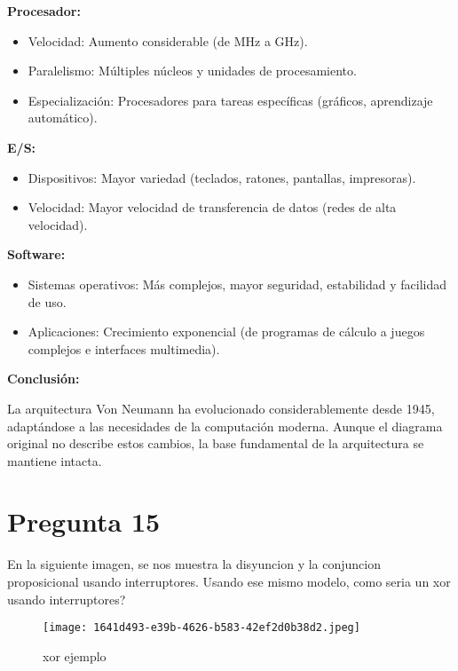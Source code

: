 \documentclass{article}
\begin{document}
\textbf{Procesador:}

\begin{itemize}
  \item Velocidad: Aumento considerable (de MHz a GHz).
  \item Paralelismo: Múltiples núcleos y unidades de procesamiento.
  \item Especialización: Procesadores para tareas específicas (gráficos, aprendizaje automático).
\end{itemize}

\textbf{E/S:}

\begin{itemize}
  \item Dispositivos: Mayor variedad (teclados, ratones, pantallas, impresoras).
  \item Velocidad: Mayor velocidad de transferencia de datos (redes de alta velocidad).
\end{itemize}

\textbf{Software:}

\begin{itemize}
  \item Sistemas operativos: Más complejos, mayor seguridad, estabilidad y facilidad de uso.
  \item Aplicaciones: Crecimiento exponencial (de programas de cálculo a juegos complejos e interfaces multimedia).
\end{itemize}

\textbf{Conclusión:}

La arquitectura Von Neumann ha evolucionado considerablemente desde 1945, adaptándose a las necesidades de la computación moderna. Aunque el diagrama original no describe estos cambios, la base fundamental de la arquitectura se mantiene intacta.

\section*{Pregunta 15}
En la siguiente imagen, se nos muestra la disyuncion y la conjuncion proposicional usando interruptores. Usando ese mismo modelo, como seria un xor usando interruptores?

\begin{figure} [H]
    \centering
    \texttt{[image: 1641d493-e39b-4626-b583-42ef2d0b38d2.jpeg]}
    \caption{xor ejemplo}
    \label{fig:enter-label}
\end{figure}
\end{document}
